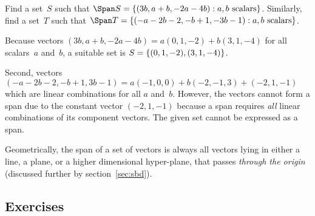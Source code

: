 \begin{example} \label{eg:}
Find a set~\(S\) such that \(\Span S=\{(3b,a+b,-2a-4b): a,b\text{ scalars}\}\).
Similarly, find a set~\(T\) such that \(\Span T=\{(-a-2b-2,-b+1, -3b-1): a,b\text{ scalars}\}\).
\begin{solution} 
Because vectors \((3b,a+b,-2a-4b)=a(0,1,-2)+b(3,1,-4)\) for all scalars~\(a\) and~\(b\),  a suitable set is \(S=\{(0,1,-2),\linebreak[1] (3,1,-4)\}\). 

Second, vectors \((-a-2b-2,-b+1, 3b-1)=a(-1,0,0)+b(-2,-1,3)+(-2,1,-1)\) which are linear combinations for all \(a\) and~\(b\). 
However, the vectors cannot form a span due to the constant vector \((-2,1,-1)\) because a span requires \emph{all} linear combinations of its component vectors.
The given set cannot be expressed as a span. 
\end{solution}
\end{example}





Geometrically, the span of a set of vectors is always all vectors lying in either a line, a plane, or  a higher dimensional hyper-plane, that passes \emph{through the origin} (discussed further by section~\ref{sec:sbd}).


\begin{comment}
Do not introduce ``Linear Independence'' yet as orthogonality is more important in applications---leave it until Chapter~\ref{ch:gee}.  
Instead soon introduce the more commonly invoked concept of orthonormal vectors.
\end{comment}




%
%



\subsection{Exercises}



